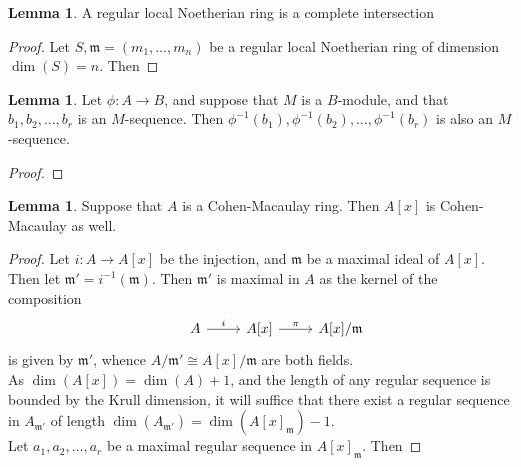 \documentclass{article}
\theoremstyle{definition}
\newtheorem{lemma}[theorem]{Lemma}
\begin{document}
\begin{lemma}
	A regular local Noetherian ring is a complete intersection
\end{lemma}
\begin{proof}

	Let $S, \mathfrak{m} = (m_1, \ldots, m_n)$ be a regular local Noetherian
	ring of dimension $\dim(S) = n$. Then 

\end{proof}

\begin{lemma}
	Let $\phi : A \to B$, and suppose that $M$ is a $B$-module,
	and that $b_1, b_2, \ldots, b_r$ is an $M$-sequence. Then 
	$\phi^{-1}(b_1), \phi^{-1}(b_2), \ldots, \phi^{-1}(b_r)$
	is also an $M$-sequence.
\end{lemma}
\begin{proof}
		
\end{proof}

\begin{lemma}
	Suppose that $A$ is a Cohen-Macaulay ring. Then $A[x]$ is Cohen-Macaulay as
	well.
\end{lemma}
\begin{proof}
	Let $i : A \to A[x]$ be the injection, and $\mathfrak{m}$ be a maximal
	ideal of $A[x]$. Then let $\mathfrak{m}' = i^{-1}(\mathfrak{m})$. Then
	$\mathfrak{m}'$ is maximal in $A$ as the kernel of the composition
	\[
		\begin{tikzcd}
			& A \arrow{r}{i} & A[x] \arrow{r}{\pi} & A[x] / \mathfrak{m}
		\end{tikzcd}
	\] 
	is given by $\mathfrak{m}'$, whence $A/\mathfrak{m}' \cong
	A[x]/\mathfrak{m}$ are both fields. \\

	As $\dim(A[x]) = \dim(A) + 1$, and the length of any regular sequence is
	bounded by the Krull dimension, it will suffice that there exist a regular
	sequence in $A_{\mathfrak{m}'}$ of length $\dim(A_{\mathfrak{m}'}) =
	\dim(A[x]_{\mathfrak{m}}) - 1$. \\

	Let $a_1, a_2, \ldots, a_r$ be a maximal regular sequence in
	$A[x]_{\mathfrak{m}}$. Then 

\end{proof}
\end{document}

